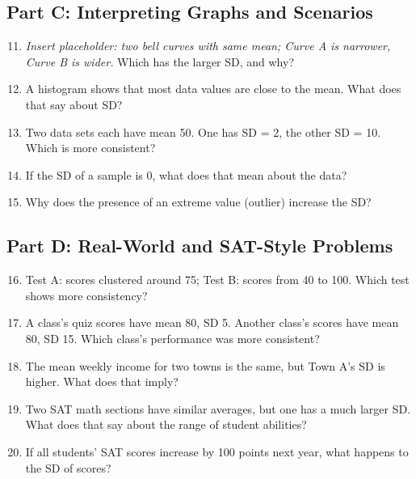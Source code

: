 \documentclass[12pt]{article}
\begin{document}
\subsection*{Part C: Interpreting Graphs and Scenarios}
\begin{enumerate}
  \setcounter{enumi}{10}
  \item \textit{Insert placeholder: two bell curves with same mean; Curve A is narrower, Curve B is wider.}  
  Which has the larger SD, and why?
  \item A histogram shows that most data values are close to the mean. What does that say about SD?
  \item Two data sets each have mean 50. One has SD = 2, the other SD = 10. Which is more consistent?
  \item If the SD of a sample is 0, what does that mean about the data?
  \item Why does the presence of an extreme value (outlier) increase the SD?
\end{enumerate}

\subsection*{Part D: Real-World and SAT-Style Problems}
\begin{enumerate}
  \setcounter{enumi}{15}
  \item Test A: scores clustered around 75; Test B: scores from 40 to 100. Which test shows more consistency?
  \item A class’s quiz scores have mean 80, SD 5. Another class’s scores have mean 80, SD 15. Which class’s performance was more consistent?
  \item The mean weekly income for two towns is the same, but Town A’s SD is higher. What does that imply?
  \item Two SAT math sections have similar averages, but one has a much larger SD. What does that say about the range of student abilities?
  \item If all students’ SAT scores increase by 100 points next year, what happens to the SD of scores?
\end{enumerate}

\newpage

\end{document}
